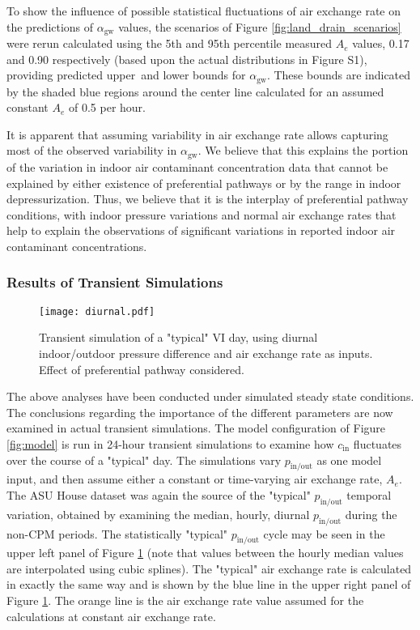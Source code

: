 \documentclass[journal=esthag,manuscript=article]{achemso}
\begin{document}
To show the influence of possible statistical fluctuations of air exchange rate on the predictions of $\alpha_\mathrm{gw}$ values, the scenarios of Figure \ref{fig:land_drain_scenarios} were rerun calculated using the 5th and 95th percentile measured $A_e$ values, 0.17 and 0.90 respectively (based upon the actual distributions in Figure S1), providing predicted upper and lower bounds for $\alpha_\mathrm{gw}$.
These bounds are indicated by the shaded blue regions around the center line calculated for an assumed constant $A_e$ of 0.5 per hour.\par

It is apparent that assuming variability in air exchange rate allows capturing most of the observed variability in $\alpha_\mathrm{gw}$.
We believe that this explains the portion of the variation in indoor air contaminant concentration data that cannot be explained by either existence of preferential pathways or by the range in indoor depressurization.
Thus, we believe that it is the interplay of preferential pathway conditions, with indoor pressure variations and normal air exchange rates that help to explain the observations of significant variations in reported indoor air contaminant concentrations.\par

\subsubsection{Results of Transient Simulations}

\begin{figure}
 \caption{Transient simulation of a "typical" VI day, using diurnal indoor/outdoor pressure difference and air exchange rate as inputs. Effect of preferential pathway considered.}\label{fig:diurnal}
 \texttt{[image: diurnal.pdf]}
\end{figure}

The above analyses have been conducted under simulated steady state conditions.
The conclusions regarding the importance of the different parameters are now examined in actual transient simulations.
The model configuration of Figure \ref{fig:model} is run in 24-hour transient simulations to examine how $c_\mathrm{in}$ fluctuates over the course  of a "typical" day.
The simulations vary $p_\mathrm{in/out}$ as one model input, and then assume either a constant or time-varying air exchange rate, $A_e$.
The ASU House dataset was again the source of the "typical" $p_\mathrm{in/out}$ temporal variation, obtained by examining the median, hourly, diurnal $p_\mathrm{in/out}$ during the non-CPM periods.
The statistically "typical" $p_\mathrm{in/out}$ cycle may be seen in the upper left panel of Figure \ref{fig:diurnal} (note that values between the hourly median values are interpolated using cubic splines).
The "typical" air exchange rate is calculated in exactly the same way and is shown by the blue line in the upper right panel of Figure \ref{fig:diurnal}.
The orange line is the air exchange rate value assumed for the calculations at constant air exchange rate.\par
\end{document}
